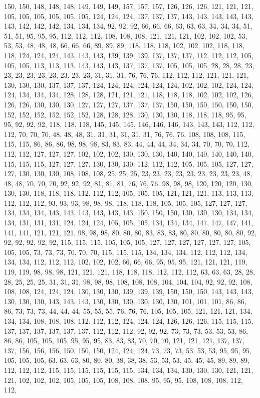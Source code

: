 150, 150, 148, 148, 148, 149, 149, 149, 157, 157, 157, 126, 126, 126, 121, 121, 121, 105, 105, 105, 105, 105, 105, 124, 124, 124, 137, 137, 137, 143, 143, 143, 143, 143, 143, 142, 142, 142, 134, 134, 134, 92, 92, 92, 66, 66, 66, 63, 63, 63, 34, 34, 34, 51, 51, 51, 95, 95, 95, 112, 112, 112, 108, 108, 108, 121, 121, 121, 102, 102, 102, 53, 53, 53, 48, 48, 48, 66, 66, 66, 89, 89, 89, 118, 118, 118, 102, 102, 102, 118, 118, 118, 124, 124, 124, 143, 143, 143, 139, 139, 139, 137, 137, 137, 112, 112, 112, 105, 105, 105, 113, 113, 113, 143, 143, 143, 137, 137, 137, 105, 105, 105, 28, 28, 28, 23, 23, 23, 23, 23, 23, 23, 23, 23, 31, 31, 31, 76, 76, 76, 112, 112, 112, 121, 121, 121, 130, 130, 130, 137, 137, 137, 124, 124, 124, 124, 124, 124, 102, 102, 102, 124, 124, 124, 134, 134, 134, 128, 128, 128, 121, 121, 121, 118, 118, 118, 102, 102, 102, 126, 126, 126, 130, 130, 130, 127, 127, 127, 137, 137, 137, 150, 150, 150, 150, 150, 150, 152, 152, 152, 152, 152, 152, 128, 128, 128, 130, 130, 130, 118, 118, 118, 95, 95, 95, 92, 92, 92, 118, 118, 118, 145, 145, 145, 146, 146, 146, 143, 143, 143, 112, 112, 112, 70, 70, 70, 48, 48, 48, 31, 31, 31, 31, 31, 31, 76, 76, 76, 108, 108, 108, 115, 115, 115, 86, 86, 86, 98, 98, 98, 83, 83, 83, 44, 44, 44, 34, 34, 34, 70, 70, 70, 112, 112, 112, 127, 127, 127, 102, 102, 102, 130, 130, 130, 140, 140, 140, 140, 140, 140, 115, 115, 115, 127, 127, 127, 130, 130, 130, 112, 112, 112, 105, 105, 105, 127, 127, 127, 130, 130, 130, 108, 108, 108, 25, 25, 25, 23, 23, 23, 23, 23, 23, 23, 23, 23, 48, 48, 48, 70, 70, 70, 92, 92, 92, 81, 81, 81, 76, 76, 76, 98, 98, 98, 120, 120, 120, 130, 130, 130, 118, 118, 118, 112, 112, 112, 105, 105, 105, 121, 121, 121, 113, 113, 113, 112, 112, 112, 93, 93, 93, 98, 98, 98, 118, 118, 118, 105, 105, 105, 127, 127, 127, 134, 134, 134, 143, 143, 143, 143, 143, 143, 150, 150, 150, 130, 130, 130, 134, 134, 134, 131, 131, 131, 124, 124, 124, 105, 105, 105, 134, 134, 134, 147, 147, 147, 141, 141, 141, 121, 121, 121, 98, 98, 98, 80, 80, 80, 83, 83, 83, 80, 80, 80, 80, 80, 80, 92, 92, 92, 92, 92, 92, 115, 115, 115, 105, 105, 105, 127, 127, 127, 127, 127, 127, 105, 105, 105, 73, 73, 73, 70, 70, 70, 115, 115, 115, 134, 134, 134, 112, 112, 112, 134, 134, 134, 112, 112, 112, 102, 102, 102, 66, 66, 66, 95, 95, 95, 121, 121, 121, 119, 119, 119, 98, 98, 98, 121, 121, 121, 118, 118, 118, 112, 112, 112, 63, 63, 63, 28, 28, 28, 25, 25, 25, 31, 31, 31, 98, 98, 98, 108, 108, 108, 104, 104, 104, 92, 92, 92, 108, 108, 108, 124, 124, 124, 130, 130, 130, 139, 139, 139, 150, 150, 150, 143, 143, 143, 130, 130, 130, 143, 143, 143, 130, 130, 130, 130, 130, 130, 101, 101, 101, 86, 86, 86, 73, 73, 73, 44, 44, 44, 55, 55, 55, 76, 76, 76, 105, 105, 105, 121, 121, 121, 134, 134, 134, 108, 108, 108, 112, 112, 112, 124, 124, 124, 126, 126, 126, 115, 115, 115, 137, 137, 137, 137, 137, 137, 112, 112, 112, 92, 92, 92, 73, 73, 73, 53, 53, 53, 86, 86, 86, 105, 105, 105, 95, 95, 95, 83, 83, 83, 70, 70, 70, 121, 121, 121, 137, 137, 137, 156, 156, 156, 150, 150, 150, 124, 124, 124, 73, 73, 73, 53, 53, 53, 95, 95, 95, 105, 105, 105, 63, 63, 63, 80, 80, 80, 38, 38, 38, 53, 53, 53, 45, 45, 45, 89, 89, 89, 112, 112, 112, 115, 115, 115, 115, 115, 115, 134, 134, 134, 130, 130, 130, 121, 121, 121, 102, 102, 102, 105, 105, 105, 108, 108, 108, 95, 95, 95, 108, 108, 108, 112, 112, 